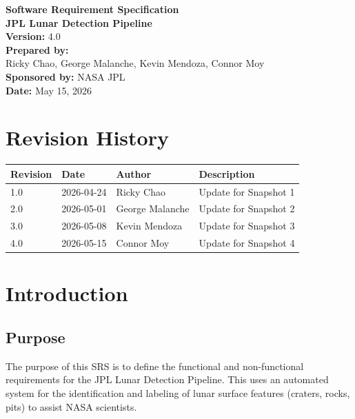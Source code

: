 \documentclass[12pt]{article}
\begin{document}
\begin{titlepage}
    \centering
    \vspace*{2cm}
    {\Huge \textbf{Software Requirement Specification}} \\
    \vspace{0.5cm}
    {\Large \textbf{JPL Lunar Detection Pipeline}} \\
    \vfill
    \textbf{Version:} 4.0 \\
    \textbf{Prepared by:} \\
     Ricky Chao, George Malanche, Kevin Mendoza, Connor Moy \\
    \vspace{1cm}
    \textbf{Sponsored by:} NASA JPL \\
    \textbf{Date:} May 15, 2026
\end{titlepage}

\newpage
\tableofcontents
\newpage

\section*{Revision History}
\begin{tabularx}{\textwidth}{|l|l|l|X|}
\hline
\textbf{Revision} & \textbf{Date} & \textbf{Author} & \textbf{Description} \\ \hline
1.0 & 2026-04-24 & Ricky Chao & Update for Snapshot 1 \\ \hline
2.0 & 2026-05-01 & George Malanche & Update for Snapshot 2\\ \hline
3.0 & 2026-05-08 & Kevin Mendoza & Update for Snapshot 3 \\ \hline
4.0 & 2026-05-15 & Connor Moy & Update for Snapshot 4 \\ \hline
\end{tabularx}


\section{Introduction}
\subsection{Purpose}
The purpose of this SRS is to define the functional and non-functional requirements for the JPL Lunar Detection Pipeline. This uses an automated system for the identification and labeling of lunar surface features (craters, rocks, pits) to assist NASA scientists.
\end{document}
